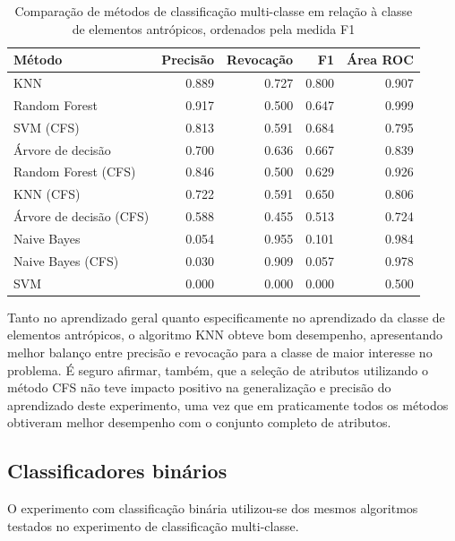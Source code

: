 \begin{table}[h]
\centering
\begin{tabulary}{\linewidth}{|L|R|R|R|R|}
\hline
\textbf{Método} & \textbf{Precisão} & \textbf{Revocação} & \textbf{F1} & \textbf{Área ROC} \\ \hline
KNN                     & 0.889 & 0.727 & 0.800 & 0.907 \\ \hline
Random Forest           & 0.917 & 0.500 & 0.647 & 0.999 \\ \hline
SVM (CFS)               & 0.813 & 0.591 & 0.684 & 0.795 \\ \hline
Árvore de decisão       & 0.700 & 0.636 & 0.667 & 0.839 \\ \hline
Random Forest (CFS)     & 0.846 & 0.500 & 0.629 & 0.926 \\ \hline
KNN (CFS)               & 0.722 & 0.591 & 0.650 & 0.806 \\ \hline
Árvore de decisão (CFS) & 0.588 & 0.455 & 0.513 & 0.724 \\ \hline
Naive Bayes             & 0.054 & 0.955 & 0.101 & 0.984 \\ \hline
Naive Bayes (CFS)       & 0.030 & 0.909 & 0.057 & 0.978 \\ \hline
SVM                     & 0.000 & 0.000 & 0.000 & 0.500 \\ \hline
\end{tabulary}
\caption{Comparação de métodos de classificação multi-classe em relação à classe de elementos antrópicos, ordenados pela medida F1}
\label{tab:experimentoClassificacaoRevocacao}
\end{table}

Tanto no aprendizado geral quanto especificamente no aprendizado da classe de elementos antrópicos, o algoritmo KNN obteve bom desempenho, apresentando melhor balanço entre precisão e revocação para a classe de maior interesse no problema. É seguro afirmar, também, que a seleção de atributos utilizando o método CFS não teve impacto positivo na generalização e precisão do aprendizado deste experimento, uma vez que em praticamente todos os métodos obtiveram melhor desempenho com o conjunto completo de atributos.

\subsection{Classificadores binários}

O experimento com classificação binária utilizou-se dos mesmos algoritmos testados no experimento de classificação multi-classe.

